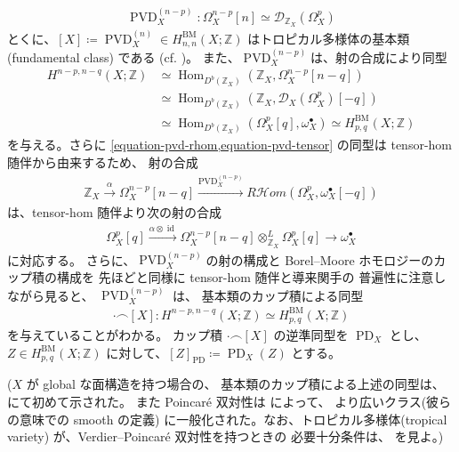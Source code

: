 \documentclass[a4paper,dvipdfmx,reqno,12pt]{amsart}
\theoremstyle{definition}
\newcommand{\deq}{\coloneqq}
\newcommand{\opn}[1]{\operatorname{#1}}
\newcommand{\xto}[1]{\xrightarrow{#1}}
\newcommand{\PD}[1]{[#1]_{\mathrm{PD}}}
\numberwithin{equation}{section}
\begin{document}
\begin{align}
\opn{PVD}^{(n-p)}_X\colon \Omega_{X}^{n-p}[n]\simeq
\mathcal{D}_{\mathbb{Z}_X}(\Omega_X^{p})
\end{align}
とくに、$[X]\deq \opn{PVD}^{(n)}_X\in H_{n,n}^{\mathrm{BM}}
(X;\mathbb{Z})$
はトロピカル多様体の基本類(fundamental class)
である (cf. \cite[Definition 4.8]{MR3894860})。
また、$\opn{PVD}^{(n-p)}_X$は、射の合成により同型
\begin{align}
H^{n-p,n-q}(X;\mathbb{Z})& \simeq
\opn{Hom}_{D^{b}(\mathbb{Z}_X)}
(\mathbb{Z}_X,\Omega_X^{n-p}[n-q]) \\
& \simeq \opn{Hom}_{D^{b}(\mathbb{Z}_X)}
(\mathbb{Z}_X,\mathcal{D}_X(\Omega_X^{p})[-q])
\label{equation-pvd-rhom} \\
& \simeq \opn{Hom}_{D^{b}(\mathbb{Z}_X)}
(\Omega_X^{p}[q],\omega_X^{\bullet})
\simeq H_{p,q}^{\mathrm{BM}}(X;\mathbb{Z})
\label{equation-pvd-tensor}
\end{align}
を与える。さらに
\cref{equation-pvd-rhom,equation-pvd-tensor}
の同型は tensor-hom 随伴から由来するため、
射の合成
\begin{align}
\mathbb{Z}_X \xto{\alpha} \Omega_X^{n-p}[n-q] 
\xto{\opn{PVD}^{(n-p)}_X} 
R\mathcal{H}om (\Omega_X^{p},\omega_X^{\bullet}[-q])
\end{align}
は、tensor-hom 随伴より次の射の合成
\begin{align}
\Omega_X^{p}[q]\xto{\alpha \otimes \opn{id}} \Omega_X^{n-p}[n-q]\otimes^{L}_{\mathbb{Z}_X}
\Omega_X^{p}[q] \to\omega_X^{\bullet}
\end{align}
に対応する。
さらに、$\opn{PVD}^{(n-p)}_X$の射の構成と
Borel--Moore ホモロジーのカップ積の構成を
先ほどと同様に tensor-hom 随伴と導来関手の
普遍性に注意しながら見ると、
$\opn{PVD}^{(n-p)}_X$ は、
基本類のカップ積による同型
\begin{align}
\label{equation-cup-pd}
\cdot \frown [X]
\colon H^{n-p,n-q}(X;\mathbb{Z})\simeq
H^{\mathrm{BM}}_{p,q}(X;\mathbb{Z})
\end{align}
を与えていることがわかる。
カップ積 $\cdot \frown [X]$
の逆準同型を $\opn{PD}_X$ とし、
$Z\in H^{\mathrm{BM}}_{p,q}(X;\mathbb{Z})$
に対して、$\PD{Z}\deq \opn{PD}_X(Z)$ とする。

($X$ が global な面構造を持つ場合の、
基本類のカップ積による上述の同型は、
\cite[Theorem 5.3]{MR3894860} にて初めて示された。
また Poincar\'e 双対性は
\cite[Theorem 1.2]{amini2021homology}によって、
より広いクラス(彼らの意味での smooth の定義)
に一般化された。なお、トロピカル多様体(tropical variety)
が、Verdier--Poincar\'e 双対性を持つときの
必要十分条件は、\cite[Theorem 6.7]{MR4637248}
を見よ。)
\end{document}
